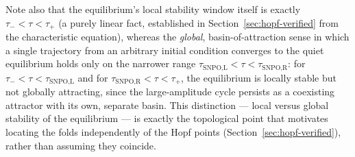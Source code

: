 \documentclass[twocolumn,10pt]{article}
\begin{document}
Note also that the equilibrium's local stability window itself is exactly $\tau_-<\tau<\tau_+$ (a purely linear fact, established in Section~\ref{sec:hopf-verified} from the characteristic equation), whereas the \emph{global}, basin-of-attraction sense in which a single trajectory from an arbitrary initial condition converges to the quiet equilibrium holds only on the narrower range $\tau_{\text{SNPO,L}}<\tau<\tau_{\text{SNPO,R}}$: for $\tau_-<\tau<\tau_{\text{SNPO,L}}$ and for $\tau_{\text{SNPO,R}}<\tau<\tau_+$, the equilibrium is locally stable but not globally attracting, since the large-amplitude cycle persists as a coexisting attractor with its own, separate basin. This distinction — local versus global stability of the equilibrium — is exactly the topological point that motivates locating the folds independently of the Hopf points (Section~\ref{sec:hopf-verified}), rather than assuming they coincide.
\end{document}
